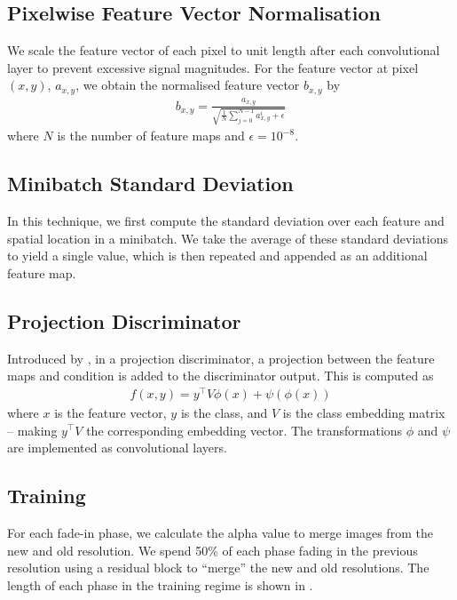 \subsection{Pixelwise Feature Vector Normalisation}

We scale the feature vector of each pixel to unit length after each convolutional layer to prevent excessive signal magnitudes.
For the feature vector at pixel $(x, y)$, $a_{x, y}$, we obtain the normalised feature vector $b_{x, y}$ by
\begin{align}
        b_{x, y} = \frac{a_{x, y}}{\sqrt{\frac{1}{N} \sum_{j=0}^{N-1} a^i_{x, y} + \epsilon}}
\end{align}
where $N$ is the number of feature maps and $\epsilon = 10^{-8}$.

\subsection{Minibatch Standard Deviation}

In this technique, we first compute the standard deviation over each feature and spatial location in a minibatch.
We take the average of these standard deviations to yield a single value, which is then repeated and appended as an additional feature map.

\subsection{Projection Discriminator}

Introduced by \citeauthor{miyato2018cgans} \cite{miyato2018cgans}, in a projection discriminator, a projection between the feature maps and condition is added to the discriminator output.
This is computed as
\begin{align}
    f(x, y) = y^\intercal V \phi(x) + \psi (\phi(x))
\end{align}
where $x$ is the feature vector, $y$ is the class, and $V$ is the class embedding matrix -- making $y^\intercal V$ the corresponding embedding vector.
The transformations $\phi$ and $\psi$ are implemented as convolutional layers. 

\subsection{Training}

For each fade-in phase, we calculate the alpha value to merge images from the new and old resolution.
We spend 50\% of each phase fading in the previous resolution using a residual block to ``merge'' the new and old resolutions.
The length of each phase in the training regime is shown in .


